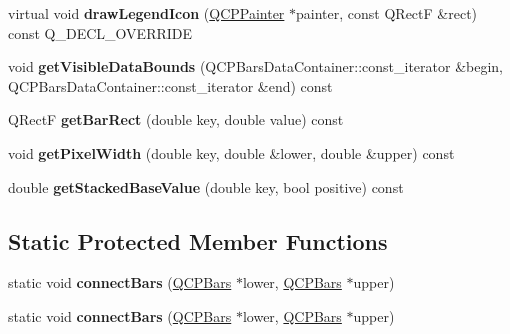 \begin{DoxyCompactItemize}
\item 
virtual void {\bfseries draw\+Legend\+Icon} (\hyperlink{class_q_c_p_painter}{Q\+C\+P\+Painter} $\ast$painter, const Q\+RectF \&rect) const Q\+\_\+\+D\+E\+C\+L\+\_\+\+O\+V\+E\+R\+R\+I\+DE\hypertarget{class_q_c_p_bars_ae1da52b19e47f95ed34d00e454a12ba9}{}\label{class_q_c_p_bars_ae1da52b19e47f95ed34d00e454a12ba9}

\item 
void {\bfseries get\+Visible\+Data\+Bounds} (Q\+C\+P\+Bars\+Data\+Container\+::const\+\_\+iterator \&begin, Q\+C\+P\+Bars\+Data\+Container\+::const\+\_\+iterator \&end) const \hypertarget{class_q_c_p_bars_ac7bd86184d5baad410cd0d9c5c07f126}{}\label{class_q_c_p_bars_ac7bd86184d5baad410cd0d9c5c07f126}

\item 
Q\+RectF {\bfseries get\+Bar\+Rect} (double key, double value) const \hypertarget{class_q_c_p_bars_a2d279b96f3d8385b865ff7c11c1c608a}{}\label{class_q_c_p_bars_a2d279b96f3d8385b865ff7c11c1c608a}

\item 
void {\bfseries get\+Pixel\+Width} (double key, double \&lower, double \&upper) const \hypertarget{class_q_c_p_bars_a794eefe4fb29b9b40583654ccbf460dc}{}\label{class_q_c_p_bars_a794eefe4fb29b9b40583654ccbf460dc}

\item 
double {\bfseries get\+Stacked\+Base\+Value} (double key, bool positive) const \hypertarget{class_q_c_p_bars_ae9b0c2fad9f29030c84bb6e62a4b605f}{}\label{class_q_c_p_bars_ae9b0c2fad9f29030c84bb6e62a4b605f}

\end{DoxyCompactItemize}
\subsection*{Static Protected Member Functions}
\begin{DoxyCompactItemize}
\item 
static void {\bfseries connect\+Bars} (\hyperlink{class_q_c_p_bars}{Q\+C\+P\+Bars} $\ast$lower, \hyperlink{class_q_c_p_bars}{Q\+C\+P\+Bars} $\ast$upper)\hypertarget{class_q_c_p_bars_a6ea37802cd22f97235cab614b14b9f19}{}\label{class_q_c_p_bars_a6ea37802cd22f97235cab614b14b9f19}

\item 
static void {\bfseries connect\+Bars} (\hyperlink{class_q_c_p_bars}{Q\+C\+P\+Bars} $\ast$lower, \hyperlink{class_q_c_p_bars}{Q\+C\+P\+Bars} $\ast$upper)\hypertarget{class_q_c_p_bars_a195e53438d6adaff6636dda7a744afa6}{}\label{class_q_c_p_bars_a195e53438d6adaff6636dda7a744afa6}

\end{DoxyCompactItemize}
